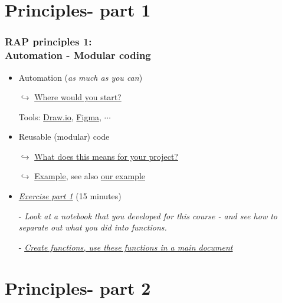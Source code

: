 \documentclass[xcolor=x11names,compress]{beamer}
\renewcommand{\(}{\begin{columns}}
\renewcommand{\)}{\end{columns}}
\newcommand{\<}[1]{\begin{column}{#1}}
\renewcommand{\>}{\end{column}}
\begin{document}
\section{Principles- part 1}

\begin{frame}[<+->]
   \frametitle{RAP principles 1:\\  Automation - Modular coding}
   \pause
    \begin{itemize}[<+->]
     \item Automation (\emph{as much as you can})
     \item[$\hookrightarrow$]\href{https://sergegoussev.github.io/ESCAP_RAP_class/docs/applying_rap/process-mapping.html\#overview-of-the-ads-processing-view}{Where would you start? }
     \item[Tools:]\href{https://app.diagrams.net/}{Draw.io}, \href{https://www.figma.com/design/}{Figma}, $\cdots$
     \item Reusable (modular) code
     \item[$\hookrightarrow$]\href{https://sergegoussev.github.io/ESCAP_RAP_class/docs/teaching_materials/sept_18/sept_18_session.html\#principle-2-modular-re-usableBuild blocs}{What does this means for your project?}
     \item[$\hookrightarrow$]\href{https://sergegoussev.github.io/ESCAP_RAP_class/docs/teaching_materials/sept_18/sept_18_session.html\#what-does-this-mean-if-we-put-it-together}{Example},  see also \href{https://sergegoussev.github.io/ESCAP_RAP_class/notebooks/scraping_experiment.html}{our example}
     \item \href{https://sergegoussev.github.io/ESCAP_RAP_class/docs/teaching_materials/sept_18/sept_18_session.html\#excercize-1}{\emph{Exercise part 1}} (15 minutes)
     \item[-] \emph{Look at a notebook that you developed for this course - and see how to separate out what you did into functions.}
     \item[-] \href{https://nhsdigital.github.io/rap-community-of-practice/training_resources/python/python-functions/\#coding-challenge}{\emph{Create functions, use these functions in a main document}}
    \end{itemize}
\end{frame}


\section{Principles- part 2}
\end{document}
